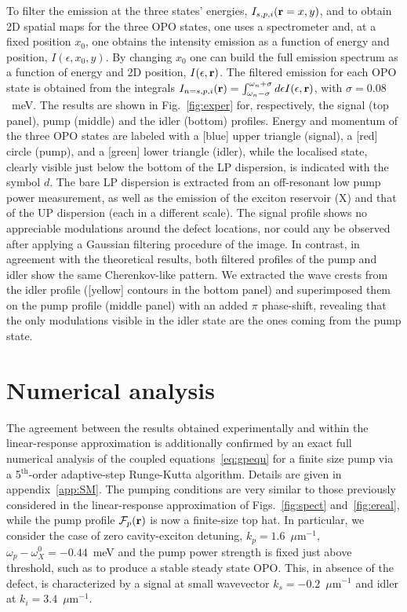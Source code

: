 To filter the emission at the three states' energies,
$I_{s,p,i}(\mathbf{r}=x,y)$, and to obtain 2D spatial maps for the three
OPO states, one uses a spectrometer and, at a fixed position $x_0$,
one obtains the intensity emission as a function of energy and
position, $I(\epsilon,x_0,y)$. By changing $x_0$ one can build the
full emission spectrum as a function of energy and 2D position,
$I(\epsilon,\mathbf{r})$. The filtered emission for each OPO state is
obtained from the integrals
$I_{n=s,p,i}(\mathbf{r}) = \int_{\omega_n-\sigma}^{\omega_n+\sigma}
d\epsilon I(\epsilon, \mathbf{r})$, with $\sigma=0.08$~meV. The results
are shown in Fig.~\ref{fig:exper} for, respectively, the signal (top
panel), pump (middle) and the idler (bottom) profiles. Energy and
momentum of the three OPO states are labeled with a [blue] upper
triangle (signal), a [red] circle (pump), and a [green] lower triangle
(idler), while the localised state, clearly visible just below the
bottom of the LP dispersion, is indicated with the symbol $d$. The
bare LP dispersion is extracted from an off-resonant low pump power
measurement, as well as the emission of the exciton reservoir (X) and
that of the UP dispersion (each in a different scale).
%
The signal profile shows no appreciable modulations around the defect
locations, nor could any  be observed after applying a Gaussian
filtering procedure of the image.
%
In contrast, in agreement with the theoretical results, both filtered
profiles of the pump and idler show the same Cherenkov-like pattern. We
extracted the wave crests from the idler profile ([yellow] contours in
the bottom panel) and superimposed them on the pump profile (middle
panel) with an added $\pi$ phase-shift, revealing that the only
modulations visible in the idler state are the ones coming from the
pump state.


\section{Numerical analysis}
\label{sec:numerical-analysis}
%
The agreement between the results obtained experimentally and within
the linear-response approximation is additionally confirmed by an
exact full numerical analysis of the coupled
equations~\eqref{eq:gpequ} for a finite size pump via a
5$^{\text{th}}$-order adaptive-step Runge-Kutta algorithm.
%
Details are given in appendix~\ref{app:SM}.
%
The pumping conditions are very similar to those previously considered
in the linear-response approximation of Figs.~\ref{fig:spect}
and~\ref{fig:ereal}, while the pump profile $\mathcal{F}_p(\mathbf{r})$ is
now a finite-size top hat. In particular, we consider the case of zero
cavity-exciton detuning, $k_p=1.6$~$\mu$m$^{-1}$,
$\omega_p-\omega_X^0 = -0.44$~meV and the pump power strength is fixed
just above threshold, such as to produce a stable steady state OPO.
This, in absence of the defect, is characterized by a signal at small
wavevector $k_s=-0.2$~$\mu$m$^{-1}$ and idler at
$k_i=3.4$~$\mu$m$^{-1}$.

